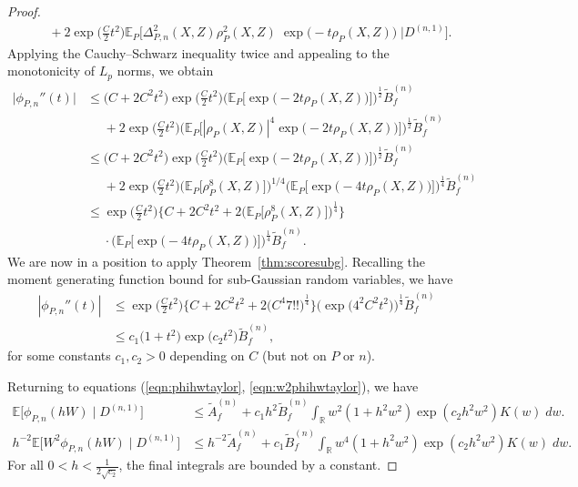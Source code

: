 \documentclass[aos]{imsart}
\newcommand{\R}{\mathbb{R}}
\newcommand{\E}{\mathbb{E}}
\begin{document}
\begin{proof}
\begin{align}
			&\phantom{=} + 2 \exp\bigg(\frac{C}{2}t^2\bigg) \E_P \Big[ \Delta_{P,n}^2 (X,Z)\rho^2_P(X,Z) \;\exp\big(-t\rho_P(X,Z)\big) \; \Big| D^{(n,1)}\Big]. \label{eqn:phi''bound}
		\end{align}
	Applying the Cauchy--Schwarz inequality twice and appealing to the monotonicity of $L_p$ norms, we obtain
		\begin{align*}
			\big| \phi_{P,n}''(t) \big| &\leq \big(C + 2C^2t^2\big)\exp\bigg(\frac{C}{2}t^2\bigg) \Big(\E_P \big[ \exp\big(-2 t \rho_P(X,Z)\big) \big]\Big)^{\frac{1}{2}} \tilde{B}_f^{(n)} \\
			&\phantom{=} + 2 \exp\bigg(\frac{C}{2}t^2\bigg) \Big(\E_P \big[ |\rho_P(X,Z)|^4 \exp\big(-2 t \rho_P(X,Z)\big) \big]\Big)^{\frac{1}{2}} \tilde{B}_f^{(n)}\\
                &\leq \big(C + 2C^2t^2\big)\exp\bigg(\frac{C}{2}t^2\bigg) \Big(\E_P \big[ \exp\big(-2 t \rho_P(X,Z)\big) \big]\Big)^{\frac{1}{2}} \tilde{B}_f^{(n)} \\
			&\phantom{=} + 2 \exp\bigg(\frac{C}{2}t^2\bigg) \Big(\E_P \big[ \rho^8_P(X,Z)\big]\Big)^{1/4} \Big(\E_P\big[ \exp\big(-4 t \rho_P(X,Z)\big) \big]\Big)^{\frac{1}{4}} \tilde{B}_f^{(n)}\\
			&\leq \exp\bigg(\frac{C}{2}t^2\bigg) \Bigg\{ C + 2C^2t^2+  2 \Big(\E_P \big[ \rho^{8}_P(X,Z)\big]\Big)^{\frac{1}{4}} \Bigg\} \\
   &\phantom{=} \cdot \Bigg(\E_P \bigg[ \exp\bigg(- 4 t \rho_P(X,Z)\bigg) \bigg]\Bigg)^{\frac{1}{4}} \tilde{B}_f^{(n)}.
		\end{align*}
		We are now in a position to apply Theorem~\ref{thm:scoresubg}. Recalling the moment generating function bound for sub-Gaussian random variables, we have 
		\begin{align*}
			|\phi_{P,n}''(t)| &\leq \exp\bigg(\frac{C}{2}t^2\bigg) \Bigg\{ C + 2C^2t^2+  2 \Big(C^{4}7!!\Big)^{\frac{1}{4}} \Bigg\}  \Big(\exp\big(4^2 C^2 t^2\big)\Big)^{\frac{1}{4}} \tilde{B}_f^{(n)} \\
			&\leq c_1 \big(1 + t^2 \big) \exp\big(c_2 t^2 \big) \tilde{B}_f^{(n)},
		\end{align*}
		for some constants $c_1,c_2>0$ depending on $C$ (but not on $P$ or $n$).
		
		Returning to equations (\ref{eqn:phihwtaylor}, \ref{eqn:w2phihwtaylor}), we have \begin{align*}
			\E\big[\phi_{P,n}(hW)\;\big|\; D^{(n,1)}\big]
			&\leq \tilde{A}_f^{(n)} + c_1 h^2 \tilde{B}_f^{(n)} \int_\R w^2(1+h^2w^2)\exp(c_2h^2w^2)K(w) \; dw.\\
			h^{-2}\E\big[W^2\phi_{P,n}(hW)\;\big|\; D^{(n,1)}\big]
			&\leq h^{-2}\tilde{A}_f^{(n)} + c_1 \tilde{B}_f^{(n)} \int_\R w^4(1+h^2w^2)\exp(c_2h^2w^2)K(w) \; dw.
		\end{align*}
		For all $0<h<\frac1{2\sqrt{c_2}}$, the final integrals are bounded by a constant.
		

\end{proof}
\end{document}
